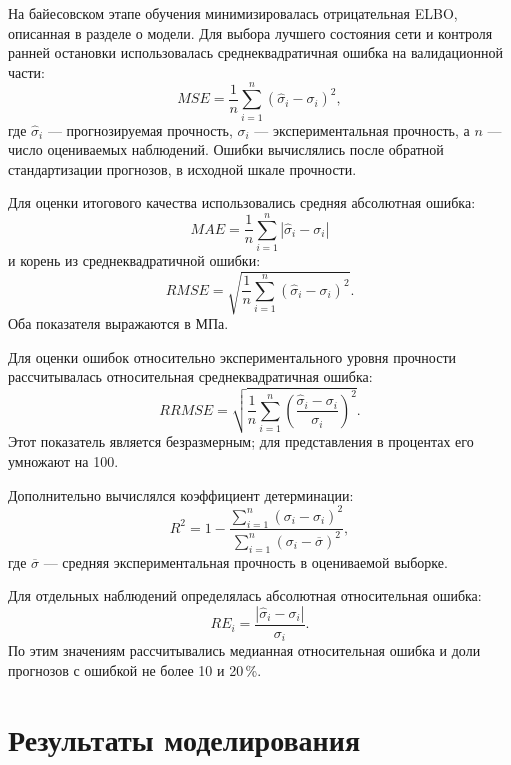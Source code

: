 На байесовском этапе обучения минимизировалась
отрицательная ELBO, описанная в разделе о модели.
Для выбора лучшего состояния сети и контроля
ранней остановки использовалась среднеквадратичная
ошибка на валидационной части:
\begin{equation}
    MSE=\frac{1}{n}\sum_{i=1}^{n}
    \left(\hat{\sigma}_i-\sigma_i\right)^2,
\end{equation}
где $\hat{\sigma}_i$ --- прогнозируемая прочность,
$\sigma_i$ --- экспериментальная прочность,
а $n$ --- число оцениваемых наблюдений.
Ошибки вычислялись после обратной стандартизации
прогнозов, в исходной шкале прочности.

Для оценки итогового качества использовались
средняя абсолютная ошибка:
\begin{equation}
    MAE=\frac{1}{n}\sum_{i=1}^{n}
    \left|\hat{\sigma}_i-\sigma_i\right|
\end{equation}
и корень из среднеквадратичной ошибки:
\begin{equation}
    RMSE=\sqrt{\frac{1}{n}\sum_{i=1}^{n}
    \left(\hat{\sigma}_i-\sigma_i\right)^2}.
\end{equation}
Оба показателя выражаются в МПа.

Для оценки ошибок относительно экспериментального
уровня прочности рассчитывалась относительная
среднеквадратичная ошибка:
\begin{equation}
    RRMSE=\sqrt{\frac{1}{n}\sum_{i=1}^{n}
    \left(
        \frac{\hat{\sigma}_i-\sigma_i}{\sigma_i}
    \right)^2}.
\end{equation}
Этот показатель является безразмерным;
для представления в процентах его умножают на 100.

Дополнительно вычислялся коэффициент детерминации:
\begin{equation}
    R^2=1-
    \frac{\sum_{i=1}^{n}
    \left(\sigma_i-\hat{\sigma}_i\right)^2}
    {\sum_{i=1}^{n}
    \left(\sigma_i-\overline{\sigma}\right)^2},
\end{equation}
где $\overline{\sigma}$ --- средняя экспериментальная
прочность в оцениваемой выборке.

Для отдельных наблюдений определялась абсолютная
относительная ошибка:
\begin{equation}
    RE_i=
    \frac{\left|\hat{\sigma}_i-\sigma_i\right|}
    {\sigma_i}.
\end{equation}
По этим значениям рассчитывались медианная
относительная ошибка и доли прогнозов с ошибкой
не более 10 и 20\,\%.

\section{Результаты моделирования}

